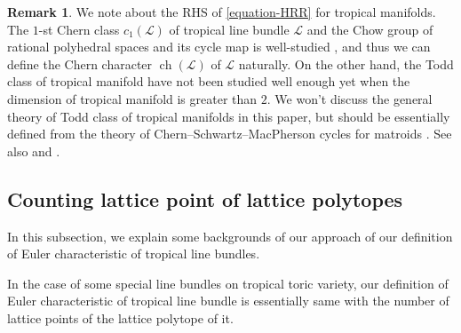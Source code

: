 \documentclass[a4paper,dvipdfmx,reqno,12pt]{amsart}
\theoremstyle{definition}
\newtheorem{remark}[theorem]{Remark}
\newcommand{\opn}[1]{\operatorname{#1}}
\numberwithin{equation}{section}
\begin{document}
\begin{remark}
\label{remark-todd-class}
We note about the RHS of \cref{equation-HRR} 
for tropical manifolds. 
The $1$-st Chern class $c_1(\mathcal{L})$ of 
tropical line bundle $\mathcal{L}$ and 
the Chow group of rational polyhedral spaces and 
its cycle map is 
well-studied \cite{gross2019sheaftheoretic},
and thus we can define the Chern character
$\opn{ch}(\mathcal{L})$ of 
$\mathcal{L}$ naturally.
On the other hand, the Todd class of tropical manifold
have not been studied well enough yet  
when the dimension of tropical manifold is greater
than $2$.
We won't discuss the general theory of Todd class of tropical 
manifolds in this paper, 
but should be essentially defined from the theory of 
Chern--Schwartz--MacPherson cycles for matroids 
\cite[Previous work]{lopezdemedranoChernSchwartzMacPhersonCyclesMatroids2020}.
See also \cite[5.3]{mikhalkinTropicalGeometryIts2006} and
\cite[Definition 3.20]{shawTropicalSurfaces2015a}.
\end{remark}

\subsection{Counting lattice point of lattice polytopes}
In this subsection, we explain some backgrounds of 
our approach of our definition of Euler characteristic
of tropical line bundles.

In the case of some special line bundles on
tropical toric variety, our definition of Euler 
characteristic of tropical line bundle is essentially same with the
number of lattice points of the lattice polytope of it.
\end{document}
